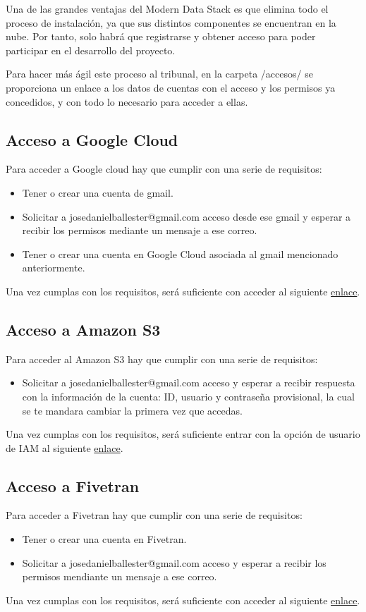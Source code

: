 Una de las grandes ventajas del Modern Data Stack es que elimina todo el proceso de instalación, ya que sus distintos componentes se encuentran en la nube. Por tanto, solo habrá que registrarse y obtener acceso para poder participar en el desarrollo del proyecto.

Para hacer más ágil este proceso al tribunal, en la carpeta /accesos/ se proporciona un enlace a los datos de cuentas con el acceso y los permisos ya concedidos, y con todo lo necesario para acceder a ellas.

\subsection{Acceso a Google Cloud}
Para acceder a Google cloud hay que cumplir con una serie de requisitos:
\begin{itemize}
    \item Tener o crear una cuenta de gmail.
    \item Solicitar a josedanielballester@gmail.com acceso desde ese gmail y esperar a recibir los permisos mediante un mensaje a ese correo.
    \item Tener o crear una cuenta en Google Cloud asociada al gmail mencionado anteriormente.
\end{itemize}
Una vez cumplas con los requisitos, será suficiente con acceder al siguiente \href{https://console.cloud.google.com/home/dashboard?authuser=1&project=confident-trail-355019}{enlace}.

\subsection{Acceso a Amazon S3}
Para acceder al Amazon S3 hay que cumplir con una serie de requisitos:
\begin{itemize}
    \item Solicitar a josedanielballester@gmail.com acceso y esperar a recibir respuesta con la información de la cuenta: ID, usuario y contraseña provisional, la cual se te mandara cambiar la primera vez que accedas.
\end{itemize}
Una vez cumplas con los requisitos, será suficiente entrar con la opción de usuario de IAM al siguiente \href{https://s3.console.aws.amazon.com/s3/buckets/covidmoderndatastack?region=eu-west-3&tab=objects#}{enlace}.
\subsection{Acceso a Fivetran}
Para acceder a Fivetran hay que cumplir con una serie de requisitos:
\begin{itemize}
    \item Tener o crear una cuenta en Fivetran.
    \item Solicitar a josedanielballester@gmail.com acceso y esperar a recibir los permisos mendiante un mensaje a ese correo.
\end{itemize}
Una vez cumplas con los requisitos, será suficiente con acceder al siguiente \href{https://fivetran.com/account}{enlace}.

